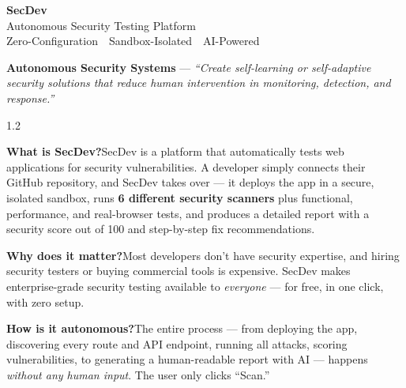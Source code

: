 \documentclass[11pt, a4paper]{article}
\begin{document}
\thispagestyle{empty}

\vspace*{0.5cm}
\begin{center}
  {\fontsize{42}{48}\selectfont\bfseries\color{white}SecDev}\\[8pt]
  {\LARGE\color{white!90}Autonomous Security Testing Platform}\\[4pt]
  {\normalsize\color{white!75}Zero-Configuration \,\textbar\, Sandbox-Isolated \,\textbar\, AI-Powered}
\end{center}

\vspace{1.8cm}

\begin{tcolorbox}[highlight, title={\faShieldAlt\enspace Hackathon Problem Statement}]
\textbf{Autonomous Security Systems} --- \textit{``Create self-learning or self-adaptive security solutions that reduce human intervention in monitoring, detection, and response.''}
\end{tcolorbox}

\vspace{0.4cm}

\begin{tcolorbox}[graycard]
\begin{spacing}{1.2}
{\normalsize
\textbf{What is SecDev?}\enspace SecDev is a platform that automatically tests web applications for security vulnerabilities. A developer simply connects their GitHub repository, and SecDev takes over --- it deploys the app in a secure, isolated sandbox, runs \textbf{6 different security scanners} plus functional, performance, and real-browser tests, and produces a detailed report with a security score out of 100 and step-by-step fix recommendations.

\vspace{4pt}
\textbf{Why does it matter?}\enspace Most developers don't have security expertise, and hiring security testers or buying commercial tools is expensive. SecDev makes enterprise-grade security testing available to \textit{everyone} --- for free, in one click, with zero setup.

\vspace{4pt}
\textbf{How is it autonomous?}\enspace The entire process --- from deploying the app, discovering every route and API endpoint, running all attacks, scoring vulnerabilities, to generating a human-readable report with AI --- happens \textit{without any human input}. The user only clicks ``Scan.''
}
\end{spacing}
\end{tcolorbox}
\end{document}
